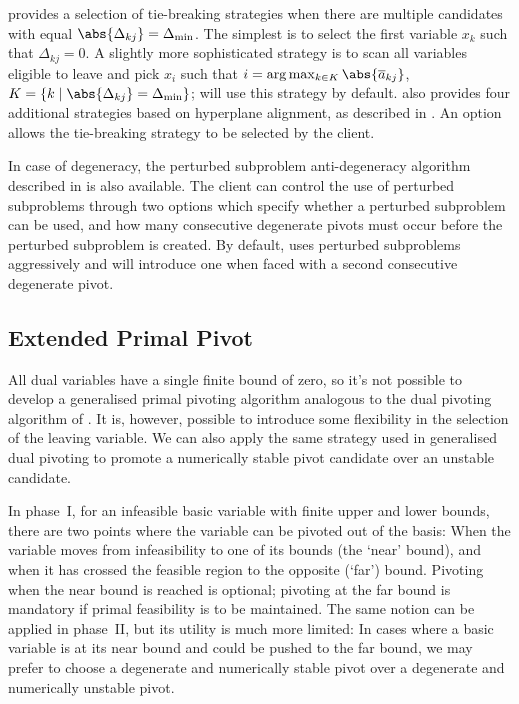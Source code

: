 \dylp provides a selection of tie-breaking strategies when there are multiple
candidates with equal
$\abs{\Delta_{kj}} = \Delta_{\mathrm{min}}$.
The simplest is to select the first variable $x_k$ such that $\Delta_{kj} = 0$.
A slightly more sophisticated strategy is to scan all variables
eligible to leave and pick $x_i$ such that
$i = \arg \max_{k \in K} \abs{\overline{a}_{kj}}$,
$K = \{ k \mid \abs{\Delta_{kj}} =  \Delta_{\mathrm{min}} \}$;
\dylp will use this strategy by default.
\dylp also provides four additional strategies based on hyperplane alignment,
as described in .
An option allows the tie-breaking strategy to be selected by the client.

In case of degeneracy, the perturbed subproblem anti-degeneracy algorithm
described in  is also available.
The client can control the use of perturbed subproblems through two options
which specify whether a perturbed subproblem can be used, and how many
consecutive degenerate pivots must occur before the perturbed subproblem
is created.
By default, \dylp uses perturbed subproblems aggressively and will
introduce one when faced with a second consecutive degenerate pivot.

\subsection{Extended Primal Pivot}
\label{sec:PrimalGenSelectOutVar}

All dual variables have a single finite bound of zero, so it's not possible to
develop a generalised primal pivoting algorithm analogous to the dual pivoting
algorithm of .
It is, however, possible to introduce some flexibility in the selection of the
leaving variable.
We can also apply the same strategy used in generalised dual
pivoting to promote a numerically stable pivot candidate over an unstable 
candidate.

In phase~I, for an infeasible basic variable with finite upper and
lower bounds, there are two points where the variable 
can be pivoted out of the basis: When the variable moves from infeasibility
to one of its bounds (the `near' bound), and when it has crossed the feasible
region to the opposite (`far') bound.
Pivoting when the near bound is reached is optional; pivoting at the far
bound is mandatory if primal feasibility is to be maintained.
The same notion can be applied in phase~II, but its utility is much more
limited: In cases where a basic variable is at its near bound and
could be pushed to the far bound, we may prefer
to choose a degenerate and numerically stable pivot over a degenerate and
numerically unstable pivot.

